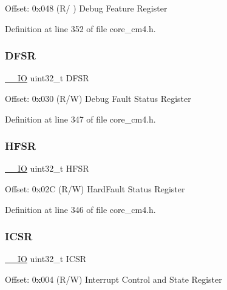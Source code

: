 Offset\+: 0x048 (R/ ) Debug Feature Register 

Definition at line 352 of file core\+\_\+cm4.\+h.

\mbox{\label{struct_s_c_b___type_a415598d9009bb3ffe9f35e03e5a386fe}} 
\subsubsection{\texorpdfstring{D\+F\+SR}{DFSR}}
{\footnotesize\ttfamily \hyperlink{group___c_m_s_i_s__core__definitions_gaec43007d9998a0a0e01faede4133d6be}{\+\_\+\+\_\+\+IO} uint32\+\_\+t D\+F\+SR}

Offset\+: 0x030 (R/W) Debug Fault Status Register 

Definition at line 347 of file core\+\_\+cm4.\+h.

\mbox{\label{struct_s_c_b___type_a87aadbc5e1ffb76d755cf13f4721ae71}} 
\subsubsection{\texorpdfstring{H\+F\+SR}{HFSR}}
{\footnotesize\ttfamily \hyperlink{group___c_m_s_i_s__core__definitions_gaec43007d9998a0a0e01faede4133d6be}{\+\_\+\+\_\+\+IO} uint32\+\_\+t H\+F\+SR}

Offset\+: 0x02C (R/W) Hard\+Fault Status Register 

Definition at line 346 of file core\+\_\+cm4.\+h.

\mbox{\label{struct_s_c_b___type_a8fec9e122b923822e7f951cd48cf1d47}} 
\subsubsection{\texorpdfstring{I\+C\+SR}{ICSR}}
{\footnotesize\ttfamily \hyperlink{group___c_m_s_i_s__core__definitions_gaec43007d9998a0a0e01faede4133d6be}{\+\_\+\+\_\+\+IO} uint32\+\_\+t I\+C\+SR}

Offset\+: 0x004 (R/W) Interrupt Control and State Register 

